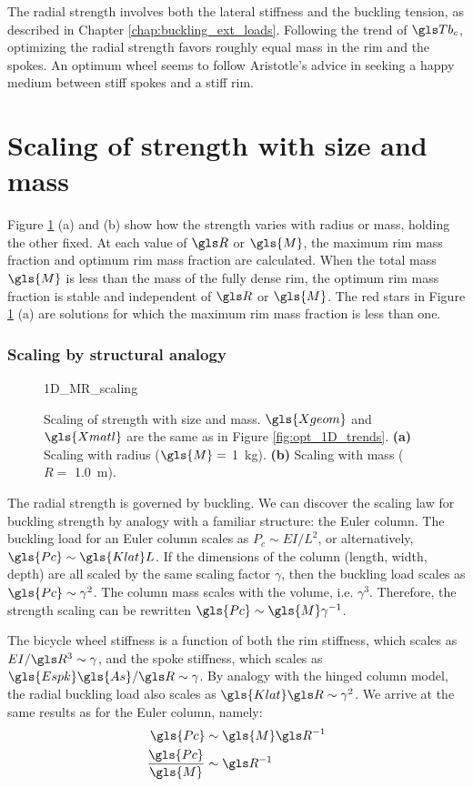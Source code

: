 \documentclass[\rootdir/thesis.tex]{subfiles}
\begin{document}
The radial strength involves both the lateral stiffness and the buckling tension, as described in Chapter \ref{chap:buckling_ext_loads}. Following the trend of $\Tb_c$, optimizing the radial strength favors roughly equal mass in the rim and the spokes. An optimum wheel seems to follow Aristotle's advice in seeking a happy medium between stiff spokes and a stiff rim.

\section{Scaling of strength with size and mass}

Figure \ref{fig:opt_1D_scaling} (a) and (b) show how the strength varies with radius or mass, holding the other fixed. At each value of $\R$ or $\gls{M}$, the maximum rim mass fraction and optimum rim mass fraction are calculated. When the total mass $\gls{M}$ is less than the mass of the fully dense rim, the optimum rim mass fraction is stable and independent of $\R$ or $\gls{M}$. The red stars in Figure \ref{fig:opt_1D_scaling} (a) are solutions for which the maximum rim mass fraction is less than one.

\subsubsection*{Scaling by structural analogy}

\begin{figure}
\centering
{1D_MR_scaling}
\caption{Scaling of strength with size and mass. $\gls{Xgeom}$ and $\gls{Xmatl}$ are the same as in Figure \ref{fig:opt_1D_trends}. \textbf{(a)} Scaling with radius ($\gls{M}=$ \SI{1}{kg}). \textbf{(b)} Scaling with mass ($R=$ \SI{1.0}{m}).}
\label{fig:opt_1D_scaling}
\end{figure}

The radial strength is governed by buckling. We can discover the scaling law for buckling strength by analogy with a familiar structure: the Euler column. The buckling load for an Euler column scales as $P_c \sim EI/L^2$, or alternatively, $\gls{Pc} \sim \gls{Klat} L$. If the dimensions of the column (length, width, depth) are all scaled by the same scaling factor $\gamma$, then the buckling load scales as $\gls{Pc} \sim \gamma^2$. The column mass scales with the volume, i.e. $\gamma^3$. Therefore, the strength scaling can be rewritten $\gls{Pc} \sim \gls{M} \gamma^{-1}$.

The bicycle wheel stiffness is a function of both the rim stiffness, which scales as $EI/\R^3 \sim \gamma$, and the spoke stiffness, which scales as $\gls{Espk}\gls{As}/\R \sim \gamma$. By analogy with the hinged column model, the radial buckling load also scales as $\gls{Klat}\R \sim \gamma^2$. We arrive at the same results as for the Euler column, namely:
\begin{subequations}
\label{eqn:opt_scaling}
\begin{align}
\gls{Pc}                 & \sim \gls{M} \R^{-1}\\
\frac{\gls{Pc}}{\gls{M}} & \sim \R^{-1}
\end{align}
\end{subequations}
\end{document}
